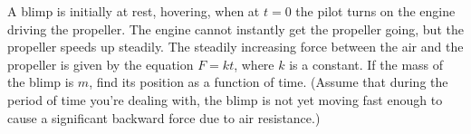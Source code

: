 A blimp is initially at rest, hovering, when at $t=0$ the
        pilot turns on the engine driving the propeller. The engine cannot
        instantly get the propeller going, but the propeller speeds
        up steadily. The steadily increasing force between the air
        and the propeller is given by the equation $F=kt$, where $k$ is
        a constant. If the mass of the blimp is $m$, find its position
        as a function of time. (Assume that during the period of
        time you're dealing with, the blimp is not yet moving fast
        enough to cause a significant backward force due to air
        resistance.)\answercheck
